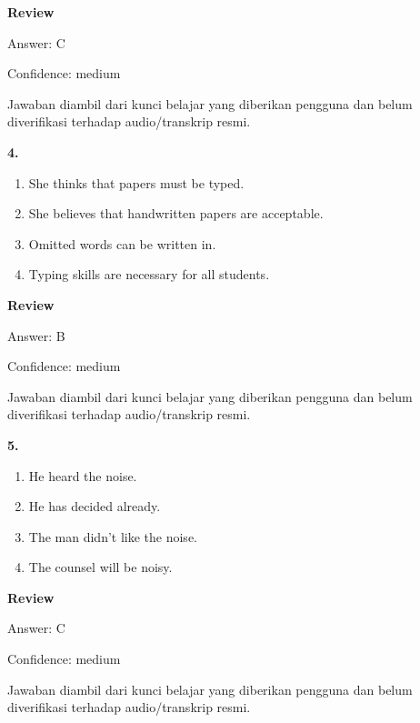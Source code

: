 \documentclass[12pt]{article}
\begin{document}
\par
\begingroup
\setlength{\parskip}{0pt}
\setlength{\parindent}{0pt}
\textbf{Review}\par
Answer: C\par
Confidence: medium\par
Jawaban diambil dari kunci belajar yang diberikan pengguna dan belum diverifikasi terhadap audio/transkrip resmi.\par
\endgroup
\par
\vspace{0.25\baselineskip}
\noindent\textbf{4.}
\begin{enumerate}[label=(\Alph*),leftmargin=*,itemsep=0.2em]
\item She thinks that papers must be typed.
\item She believes that handwritten papers are acceptable.
\item Omitted words can be written in.
\item Typing skills are necessary for all students.
\end{enumerate}
\par
\begingroup
\setlength{\parskip}{0pt}
\setlength{\parindent}{0pt}
\textbf{Review}\par
Answer: B\par
Confidence: medium\par
Jawaban diambil dari kunci belajar yang diberikan pengguna dan belum diverifikasi terhadap audio/transkrip resmi.\par
\endgroup
\par
\vspace{0.25\baselineskip}
\noindent\textbf{5.}
\begin{enumerate}[label=(\Alph*),leftmargin=*,itemsep=0.2em]
\item He heard the noise.
\item He has decided already.
\item The man didn't like the noise.
\item The counsel will be noisy.
\end{enumerate}
\par
\begingroup
\setlength{\parskip}{0pt}
\setlength{\parindent}{0pt}
\textbf{Review}\par
Answer: C\par
Confidence: medium\par
Jawaban diambil dari kunci belajar yang diberikan pengguna dan belum diverifikasi terhadap audio/transkrip resmi.\par
\endgroup
\par
\end{document}

